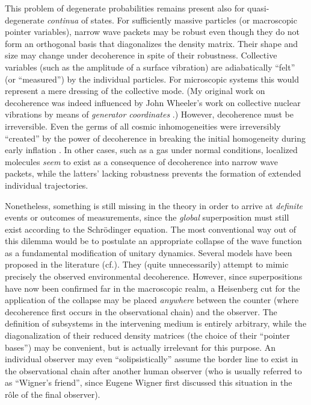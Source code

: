 This problem of degenerate probabilities remains present also for
quasi-degenerate {\it continua} of states. For sufficiently massive
particles (or macroscopic pointer variables), narrow wave packets may
be robust even though they do not form an orthogonal basis that
diagonalizes the density matrix. Their shape and size may change under
decoherence in spite of their robustness. Collective
variables (such as the amplitude of a surface vibration) are
adiabatically ``felt'' (or ``measured'') by the individual particles.
For microscopic systems this would represent a mere dressing of the
collective mode. (My original work on decoherence was indeed
influenced by John Wheeler's work on collective nuclear vibrations by
means of {\it generator coordinates}
\cite{GW}.) However, decoherence must be irreversible. Even
the germs of all cosmic inhomogeneities were irreversibly ``created''
by the power of decoherence in breaking the initial
homogeneity during early inflation
\cite{K+Polarski}. In other cases, such as a gas under normal
conditions, localized molecules {\it seem} to exist as a consequence
of decoherence into narrow wave packets, while the latters' lacking
robustness prevents the formation of extended individual trajectories.

Nonetheless, something is still missing in the theory in order to
arrive at {\it definite} events or outcomes of measurements, since the
{\it global} superposition must still exist according to the
Schr\"odinger equation. The most conventional way out of this dilemma
would be to postulate an appropriate collapse of the wave function as
a fundamental modification of unitary dynamics. Several models have
been proposed in the literature
(cf.\ts \cite{GRW}). They (quite unnecessarily) attempt to mimic
precisely the observed environmental decoherence. However, since
superpositions have now been confirmed far in the macroscopic realm, a
Heisenberg cut for the application of the collapse may be placed {\it
anywhere} between the counter (where decoherence first occurs in the
observational chain) and the observer. The definition of subsystems in
the intervening medium is entirely arbitrary, while the
diagonalization of their reduced density matrices (the choice of their
``pointer bases'') may be convenient, but is actually irrelevant for
this purpose. An individual observer may even ``solipsistically''
assume the border line to exist in the observational chain after
another human observer (who is usually referred to as ``Wigner's
friend'', since Eugene Wigner first discussed this situation in the
r\^ole of the final observer).

